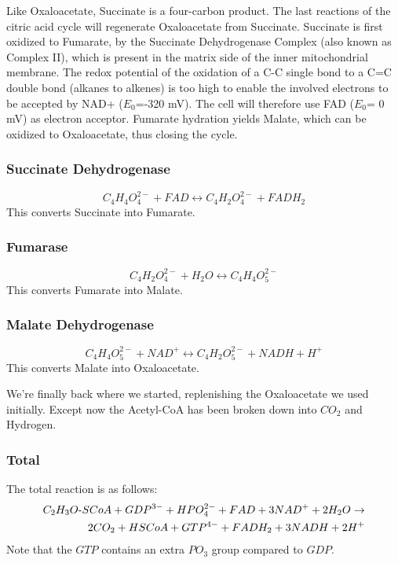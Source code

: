 \documentclass{article}
\def\mhyphen{{\hbox{-}}}
\begin{document}
Like Oxaloacetate, Succinate is a four-carbon product. The last reactions of the citric
acid cycle will regenerate Oxaloacetate from Succinate. Succinate is first oxidized to
Fumarate, by the Succinate Dehydrogenase Complex (also known as Complex II), which is
present in the matrix side of the inner mitochondrial membrane. The redox potential of the
oxidation of a C-C single bond to a C=C double bond (alkanes to alkenes) is too high to
enable the involved electrons to be accepted by NAD+ ($E_0$=-320 mV). The cell will therefore
use FAD ($E_0$= 0 mV) as electron acceptor. Fumarate hydration yields Malate, which can be
oxidized to Oxaloacetate, thus closing the cycle.

\subsubsection{Succinate Dehydrogenase}
\[
    C_4H_4O_4^{2-} + FAD \leftrightarrow C_4H_2O_4^{2-} + FADH_2
\]
This converts Succinate into Fumarate.

\subsubsection{Fumarase}
\[
    C_4H_2O_4^{2-} + H_2O \leftrightarrow C_4H_4O_5^{2-}
\]
This converts Fumarate into Malate.

\subsubsection{Malate Dehydrogenase}\label{sec_malate_dehydrogenase}
\[
    C_4H_4O_5^{2-} + NAD^+ \leftrightarrow C_4H_2O_5^{2-} + NADH + H^+
\]
This converts Malate into Oxaloacetate.

We're finally back where we started, replenishing the Oxaloacetate we used initially.
Except now the Acetyl-CoA has been broken down into $CO_2$ and Hydrogen.

\subsubsection{Total}
The total reaction is as follows:
\[
    \begin{split}
    C_2H_3O{\mhyphen}SCoA + GDP^{3-}+ HPO_4^{2-} + FAD + 3NAD^+ + 2H_2O \rightarrow \\
    2CO_2 + HSCoA + GTP^{4-} + FADH_2 + 3NADH + 2H^+
    \end{split}
\]
Note that the $GTP$ contains an extra $PO_3$ group compared to $GDP$.
\end{document}
